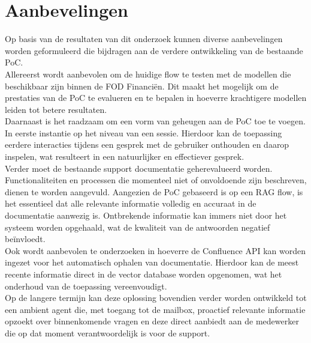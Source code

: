 
\chapter{Aanbevelingen}
\label{ch:aanbevelingen}

Op basis van de resultaten van dit onderzoek kunnen diverse aanbevelingen worden geformuleerd die bijdragen aan de verdere ontwikkeling van de bestaande PoC. 
\\[1em]
Allereerst wordt aanbevolen om de huidige flow te testen met de modellen die beschikbaar zijn binnen de FOD Financiën. Dit maakt het mogelijk om de prestaties van de PoC te evalueren en te bepalen in hoeverre krachtigere modellen leiden tot betere resultaten.
\\[1em]
Daarnaast is het raadzaam om een vorm van geheugen aan de PoC toe te voegen. In eerste instantie op het niveau van een sessie. Hierdoor kan de toepassing eerdere interacties tijdens een gesprek met de gebruiker onthouden en daarop inspelen, wat resulteert in een natuurlijker en effectiever gesprek.
\\[1em]
Verder moet de bestaande support documentatie geherevalueerd worden. Functionaliteiten en processen die momenteel niet of onvoldoende zijn beschreven, dienen te worden aangevuld. Aangezien de PoC gebaseerd is op een RAG flow, is het essentieel dat alle relevante informatie volledig en accuraat in de documentatie aanwezig is. Ontbrekende informatie kan immers niet door het systeem worden opgehaald, wat de kwaliteit van de antwoorden negatief beïnvloedt.
\\[1em]
Ook wordt aanbevolen te onderzoeken in hoeverre de Confluence API kan worden ingezet voor het automatisch ophalen van documentatie. Hierdoor kan de meest recente informatie direct in de vector database worden opgenomen, wat het onderhoud van de toepassing vereenvoudigt.
\\[1em]
Op de langere termijn kan deze oplossing bovendien verder worden ontwikkeld tot een ambient agent die, met toegang tot de mailbox, proactief relevante informatie opzoekt over binnenkomende vragen en deze direct aanbiedt aan de medewerker die op dat moment verantwoordelijk is voor de support.